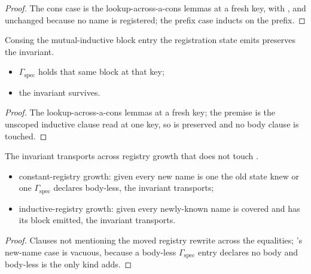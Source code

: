 \begin{proof}
\leanok
{}
 The cons case is the lookup-across-a-cons lemmas at a fresh key, with ,
 and  unchanged because no name is registered; the prefix case inducts on the
prefix.
\end{proof}
\begin{lemma}
\label{lem:RegInvShape-prime-blockCons}
\leanok
{}
 Consing the mutual-inductive block entry the registration state emits preserves the
invariant.
\begin{itemize}
\item {} $\Gamma_{\mathrm{spec}}$ holds that same block at that key;
\item {} the invariant survives.
\end{itemize}
\end{lemma}
\begin{proof}
\leanok
{}
 The lookup-across-a-cons lemmas at a fresh key; the premise is the unscoped inductive clause
read at one key, so  is preserved and no body clause is touched.
\end{proof}
\begin{lemma}
\label{lem:RegInvShape-prime-stateCongr}
\leanok
{}
 The invariant transports across registry growth that does not touch .
\begin{itemize}
\item constant-registry growth: given every new name is one the old state knew or one
$\Gamma_{\mathrm{spec}}$ declares body-less, the invariant transports;
\item inductive-registry growth: given every newly-known name is covered and has its block emitted, the
invariant transports.
\end{itemize}
\end{lemma}
\begin{proof}
\leanok
{}
 Clauses not mentioning the moved registry rewrite across the equalities; 's
new-name case is vacuous, because a body-less $\Gamma_{\mathrm{spec}}$ entry declares no body and
body-less is the only kind  adds.
\end{proof}
